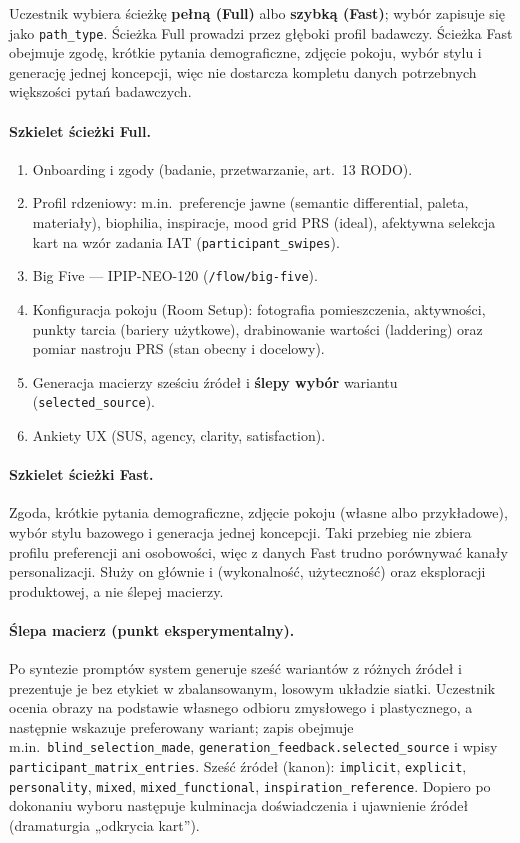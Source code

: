 Uczestnik wybiera ścieżkę \textbf{pełną (Full)} albo \textbf{szybką (Fast)}; wybór zapisuje się jako \texttt{path\_type}. Ścieżka Full prowadzi przez głęboki profil badawczy. Ścieżka Fast obejmuje zgodę, krótkie pytania demograficzne, zdjęcie pokoju, wybór stylu i generację jednej koncepcji, więc nie dostarcza kompletu danych potrzebnych większości pytań badawczych.

\paragraph{Szkielet ścieżki Full.}
\begin{enumerate}
  \item Onboarding i zgody (badanie, przetwarzanie, art.~13 RODO).
  \item Profil rdzeniowy: m.in.\ preferencje jawne (semantic differential, paleta, materiały), biophilia, inspiracje, mood grid PRS (ideal), afektywna selekcja kart na wzór zadania IAT (\texttt{participant\_swipes}).
  \item Big Five --- IPIP-NEO-120 (\texttt{/flow/big-five}).
  \item Konfiguracja pokoju (Room Setup): fotografia pomieszczenia, aktywności, punkty tarcia (bariery użytkowe), drabinowanie wartości (laddering) oraz pomiar nastroju PRS (stan obecny i docelowy).
  \item Generacja macierzy sześciu źródeł i \textbf{ślepy wybór} wariantu (\texttt{selected\_source}).
  \item Ankiety UX (SUS, agency, clarity, satisfaction).
\end{enumerate}

\paragraph{Szkielet ścieżki Fast.}
Zgoda, krótkie pytania demograficzne, zdjęcie pokoju (własne albo przykładowe), wybór stylu bazowego i generacja jednej koncepcji. Taki przebieg nie zbiera profilu preferencji ani osobowości, więc z danych Fast trudno porównywać kanały personalizacji. Służy on głównie  i  (wykonalność, użyteczność) oraz eksploracji produktowej, a nie ślepej macierzy.

\paragraph{Ślepa macierz (punkt eksperymentalny).}
Po syntezie promptów system generuje sześć wariantów z różnych źródeł i prezentuje je bez etykiet w zbalansowanym, losowym układzie siatki. Uczestnik ocenia obrazy na podstawie własnego odbioru zmysłowego i plastycznego, a następnie wskazuje preferowany wariant; zapis obejmuje m.in.\ \texttt{blind\_selection\_made}, \texttt{generation\_feedback.selected\_source} i wpisy \texttt{participant\_matrix\_entries}. Sześć źródeł (kanon): \texttt{implicit}, \texttt{explicit}, \texttt{personality}, \texttt{mixed}, \texttt{mixed\_functional}, \texttt{inspiration\_reference}. Dopiero po dokonaniu wyboru następuje kulminacja doświadczenia i ujawnienie źródeł (dramaturgia „odkrycia kart”).

